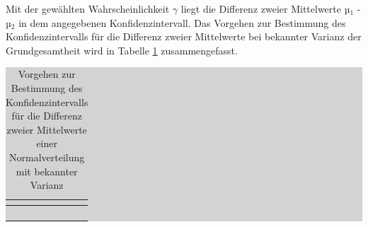 \noindent Mit der gew\"{a}hlten Wahrscheinlichkeit $\gamma$ liegt die Differenz zweier Mittelwerte µ$_{1}$ - µ$_{2}$ in dem angegebenen Konfidenzintervall. Das Vorgehen zur Bestimmung des Konfidenzintervalls f\"{u}r die Differenz zweier Mittelwerte bei bekannter Varianz der Grundgesamtheit wird in Tabelle \ref{tab:fiveseven} zusammengefasst.

\begin{table}[H]
\setlength{\arrayrulewidth}{.1em}
\caption{Vorgehen zur Bestimmung des Konfidenzintervalls f\"{u}r die Differenz zweier Mittelwerte einer Normalverteilung mit bekannter Varianz}
\setlength{\fboxsep}{0pt}%
\colorbox{lightgray}{%
%
\begin{tabular}{| c | c |}
\hline
\parbox[c][0.3in][c]{0.4in}{\smallskip\centering\textbf{\selectfont{Nr.}}} & 
\parbox[c][0.3in][c]{6.2in}{\smallskip\centering\textbf{\selectfont{Prozessschritt}}}\\ \hline

\parbox[c][0.3in][c]{0.4in}{\centering{}\selectfont{1}} & 
\parbox[c][0.3in][c]{6.2in}{\centering{}\selectfont{Wahl einer Konfidenzzahl $\gamma$}}\\ \hline

\parbox[c][0.9in][c]{0.4in}{\centering{}\selectfont{2}} & 
\parbox[c][0.9in][c]{6.2in}{\centering{}}\\ \hline

\parbox[c][0.9in][c]{0.4in}{\centering{}\selectfont{3}} & 
\parbox[c][0.9in][c]{6.2in}{\centering{}}\\ \hline

\parbox[c][0.9in][c]{0.4in}{\centering{}\selectfont{4}} & 
\parbox[c][0.9in][c]{6.2in}{\centering{}}\\ \hline

\end{tabular}%
}
\label{tab:fiveseven}
\end{table}

